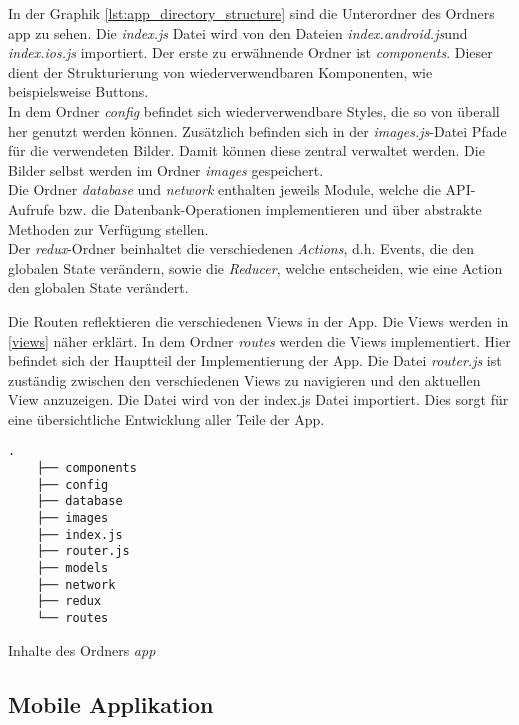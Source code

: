  In der Graphik \ref{lst:app_directory_structure} sind die Unterordner des Ordners app zu sehen. Die \textit{index.js} Datei wird von den Dateien \textit{index.android.js}und \textit{index.ios.js} importiert. Der erste zu erwähnende Ordner ist \textit{components}. Dieser dient der Strukturierung von wiederverwendbaren Komponenten, wie beispielsweise Buttons. \\
 In dem Ordner \textit{config} befindet sich wiederverwendbare Styles, die so von überall her genutzt werden können. Zusätzlich befinden sich in der \textit{images.js}-Datei Pfade für die verwendeten Bilder. Damit können diese zentral verwaltet werden. Die Bilder selbst werden im Ordner \textit{images} gespeichert.\\
 Die Ordner \textit{database} und \textit{network} enthalten jeweils Module, welche die API-Aufrufe bzw. die Datenbank-Operationen implementieren und über abstrakte Methoden zur Verfügung stellen. \\
 Der \textit{redux}-Ordner beinhaltet die verschiedenen \textit{Actions}, d.h. Events, die den globalen State verändern, sowie die \textit{Reducer}, welche entscheiden, wie eine Action den globalen State verändert.
 
 Die Routen reflektieren die verschiedenen Views in der App. Die Views werden in \ref{views} näher erklärt. In dem Ordner \textit{routes} werden die Views implementiert. Hier befindet sich der Hauptteil der Implementierung der App. Die Datei \textit{router.js} ist zuständig zwischen den verschiedenen Views zu navigieren und den aktuellen View anzuzeigen. Die Datei wird von der index.js Datei importiert. Dies sorgt für eine übersichtliche Entwicklung aller Teile der App. 
 
    \begin{lstlisting}[style=tree]
    .
    ├── components
    ├── config
    ├── database
    ├── images
    ├── index.js
    ├── router.js
    ├── models
    ├── network
    ├── redux
    └── routes

    \end{lstlisting}
    \vspace{-0.5 cm}
    \begin{listing}[H]
        \caption{Inhalte des Ordners \textit{app}}
        \label{lst:app_directory_structure}
    \end{listing}
        
        
        
    \subsection{Mobile Applikation}
        
